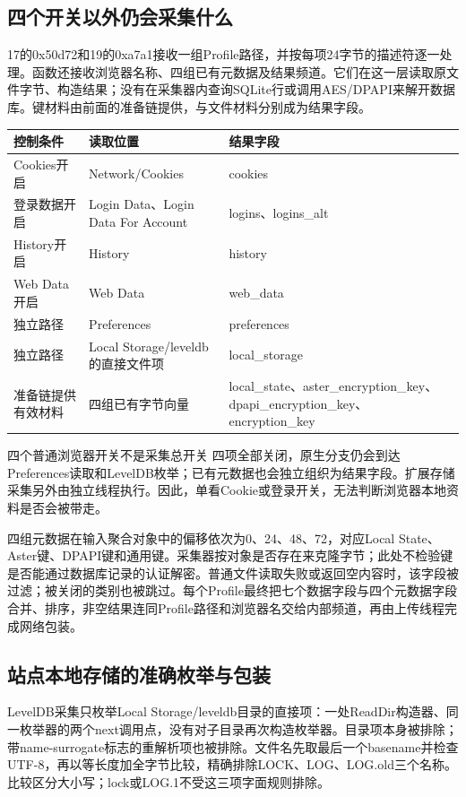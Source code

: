 \documentclass[UTF8,a4paper,zihao=5,fontset=windows]{ctexart}
\newcommand{\code}[1]{{\ttfamily\small #1}}
\begin{document}
\subsection{四个开关以外仍会采集什么}
17的\code{0x50d72}和19的\code{0xa7a1}接收一组Profile路径，并按每项24字节的描述符逐一处理。函数还接收浏览器名称、四组已有元数据及结果频道。它们在这一层读取原文件字节、构造结果；没有在采集器内查询SQLite行或调用AES/DPAPI来解开数据库。键材料由前面的准备链提供，与文件材料分别成为结果字段。

\begin{longtable}{@{}L{31mm}L{66mm}L{53mm}@{}}\toprule 控制条件 & 读取位置 & 结果字段\\\midrule\endhead
Cookies开启 & \code{Network/Cookies} & \code{cookies}\\
登录数据开启 & \code{Login Data}、\code{Login Data For Account} & \code{logins}、\code{logins\_alt}\\
History开启 & \code{History} & \code{history}\\
Web Data开启 & \code{Web Data} & \code{web\_data}\\
独立路径 & \code{Preferences} & \code{preferences}\\
独立路径 & \code{Local Storage/leveldb}的直接文件项 & \code{local\_storage}\\
准备链提供有效材料 & 四组已有字节向量 & \code{local\_state}、\code{aster\_encryption\_key}、\code{dpapi\_encryption\_key}、\code{encryption\_key}\\\bottomrule\end{longtable}

\begin{finding}{四个普通浏览器开关不是采集总开关}
四项全部关闭，原生分支仍会到达Preferences读取和LevelDB枚举；已有元数据也会独立组织为结果字段。扩展存储采集另外由独立线程执行。因此，单看Cookie或登录开关，无法判断浏览器本地资料是否会被带走。
\end{finding}

四组元数据在输入聚合对象中的偏移依次为0、24、48、72，对应Local State、Aster键、DPAPI键和通用键。采集器按对象是否存在来克隆字节；此处不检验键是否能通过数据库记录的认证解密。普通文件读取失败或返回空内容时，该字段被过滤；被关闭的类别也被跳过。每个Profile最终把七个数据字段与四个元数据字段合并、排序，非空结果连同Profile路径和浏览器名交给内部频道，再由上传线程完成网络包装。

\subsection{站点本地存储的准确枚举与包装}
LevelDB采集只枚举\code{Local Storage/leveldb}目录的直接项：一处ReadDir构造器、同一枚举器的两个next调用点，没有对子目录再次构造枚举器。目录项本身被排除；带name-surrogate标志的重解析项也被排除。文件名先取最后一个basename并检查UTF-8，再以等长度加全字节比较，精确排除\code{LOCK}、\code{LOG}、\code{LOG.old}三个名称。比较区分大小写；\code{lock}或\code{LOG.1}不受这三项字面规则排除。
\end{document}
